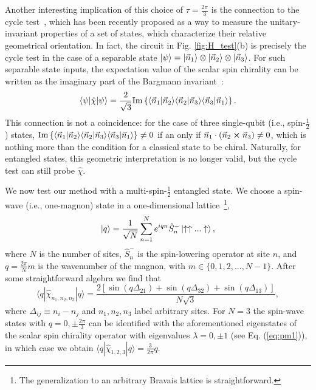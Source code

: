 \documentclass[aps,prl,twocolumn]{revtex4}
\begin{document}
Another interesting implication of this choice of $\tau = \frac{2\pi}{3}$ is the connection to the cycle test~\cite{oszmaniec21}, which has been recently proposed as a way to measure the unitary-invariant properties of a set of states, which characterize their relative geometrical orientation. In fact, the circuit in Fig. \ref{fig:H_test}(b) is precisely the cycle test in the case of a separable state $\ket{\psi} = \ket{\vec{n}_1} \otimes \ket{\vec{n}_2} \otimes \ket{\vec{n}_3}$. For such separable state inputs, the expectation value of the scalar spin chirality can be written as the imaginary part of the Bargmann invariant~\cite{Bargmann64}:
\begin{equation}
    \langle \psi | \hat{\chi} | \psi \rangle = \frac{2}{\sqrt{3}} {\rm Im} \left\{
    \langle \vec{n}_1|\vec{n}_2\rangle 
    \langle \vec{n}_2|\vec{n}_3\rangle 
    \langle \vec{n}_3|\vec{n}_1\rangle \right\}.
\end{equation}
This connection is not a coincidence: for the case of three single-qubit (i.e., spin-$\frac{1}{2}$) states, ${\rm Im} \left\{
    \langle \vec{n}_1|\vec{n}_2\rangle 
    \langle \vec{n}_2|\vec{n}_3\rangle 
    \langle \vec{n}_3|\vec{n}_1\rangle \right\} \neq 0$ if an only if $\vec{n}_1 \cdot (\vec{n}_2 \cross \vec{n}_3) \neq 0$, which is nothing more than the condition for a classical state to be chiral. 
Naturally, for entangled states, this geometric interpretation is no longer valid, but the cycle test can still probe $\hat{\chi}$.

We now test our method with a multi-spin-$\frac{1}{2}$ entangled state. We choose a spin-wave (i.e., one-magnon) state in a one-dimensional lattice~\footnote{The generalization to an arbitrary Bravais lattice is straightforward.},
\begin{equation}
    |q\rangle = \frac{1}{\sqrt{N}} \sum_{n=1}^{N} e^{i q n} \hat{S}^{-}_{n} \ket{\uparrow \uparrow ... \uparrow},
\end{equation}
where $N$ is the number of sites, $\hat{S}^{-}_{n}$ is the spin-lowering operator at site $n$, and $q=\frac{2\pi}{N} m$ is the wavenumber of the magnon, with $m \in \{ 0, 1, 2, ..., N-1 \}$.
After some straightforward algebra we find that
\begin{equation}
\langle q |\hat{\chi}_{n_1,n_2,n_3}|q\rangle = 
\frac{2 [ \sin(q \Delta_{21} ) +\sin(q\Delta_{32}) + \sin(q \Delta_{13} ) ] }{N\sqrt{3}},
\label{eq:analytical}
\end{equation}
where $\Delta_{ij} \equiv n_i - n_j$ and $n_1,n_2,n_3$ label arbitrary sites. For $N=3$ the spin-wave states with $q=0, \pm \frac{2\pi}{3}$ can be identified with the aforementioned eigenstates of the scalar spin chirality operator with eigenvalues $\lambda = 0, \pm 1$ (see Eq. (\ref{eq:pm1})), in which case we obtain $\langle q |\hat{\chi}_{1,2,3}|q\rangle= \frac{3}{2\pi} q $.
\end{document}
